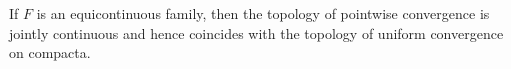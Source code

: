 If $F$ is an equicontinuous family, then the topology of pointwise convergence is jointly continuous and hence coincides with the topology of uniform convergence on compacta.
